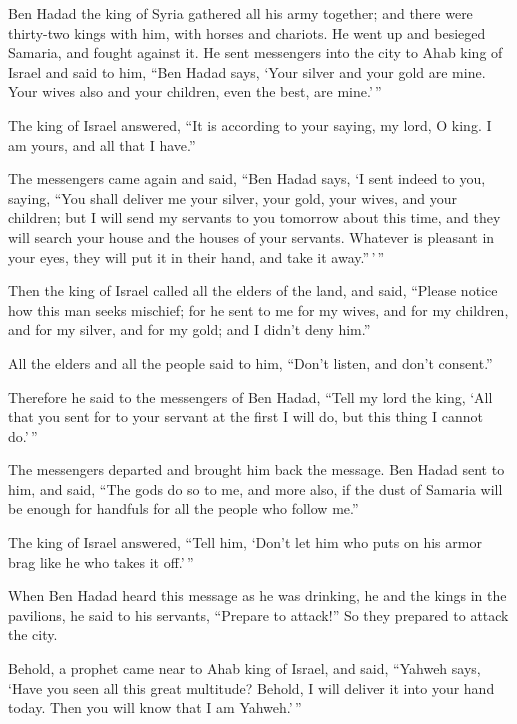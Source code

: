  Ben Hadad the king of Syria gathered all his army
together; and there were thirty-two kings with him, with horses and
chariots. He went up and besieged Samaria, and fought against it.
 He sent messengers into the city to Ahab king of Israel
and said to him, ``Ben Hadad says,  `Your silver and your
gold are mine. Your wives also and your children, even the best, are
mine.'\,''

 The king of Israel answered, ``It is according to your
saying, my lord, O king. I am yours, and all that I have.''

 The messengers came again and said, ``Ben Hadad says, `I
sent indeed to you, saying, ``You shall deliver me your silver, your
gold, your wives, and your children;  but I will send my
servants to you tomorrow about this time, and they will search your
house and the houses of your servants. Whatever is pleasant in your
eyes, they will put it in their hand, and take it away.''\,'\,''

 Then the king of Israel called all the elders of the
land, and said, ``Please notice how this man seeks mischief; for he sent
to me for my wives, and for my children, and for my silver, and for my
gold; and I didn't deny him.''

 All the elders and all the people said to him, ``Don't
listen, and don't consent.''

 Therefore he said to the messengers of Ben Hadad, ``Tell
my lord the king, `All that you sent for to your servant at the first I
will do, but this thing I cannot do.'\,''

The messengers departed and brought him back the message.
 Ben Hadad sent to him, and said, ``The gods do so to me,
and more also, if the dust of Samaria will be enough for handfuls for
all the people who follow me.''

 The king of Israel answered, ``Tell him, `Don't let him
who puts on his armor brag like he who takes it off.'\,''

 When Ben Hadad heard this message as he was drinking, he
and the kings in the pavilions, he said to his servants, ``Prepare to
attack!'' So they prepared to attack the city.

 Behold, a prophet came near to Ahab king of Israel, and
said, ``Yahweh says, `Have you seen all this great multitude? Behold, I
will deliver it into your hand today. Then you will know that I am
Yahweh.'\,''

